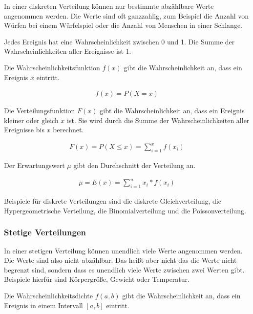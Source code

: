 \documentclass[12pt]{scrartcl}
\begin{document}
In einer diskreten Verteilung können nur bestimmte abzählbare Werte angenommen werden.
Die Werte sind oft ganzzahlig, zum Beispiel die Anzahl von Würfen bei einem Würfelspiel oder die Anzahl von Menschen in einer Schlange.\par

Jedes Ereignis hat eine Wahrscheinlichkeit zwischen 0 und 1.
Die Summe der Wahrscheinlichkeiten aller Ereignisse ist 1.\par

Die Wahrscheinlichkeitsfunktion $f(x)$ gibt die Wahrscheinlichkeit an, dass ein Ereignis $x$ eintritt.\par

\begin{align*}
    f(x) = P(X=x)
\end{align*}

Die Verteilungsfunktion $F(x)$ gibt die Wahrscheinlichkeit an, dass ein Ereignis kleiner oder gleich $x$ ist.
Sie wird durch die Summe der Wahrscheinlichkeiten aller Ereignisse bis $x$ berechnet.\par

\begin{align*}
    F(x) = P(X \leq x) = \sum_{i=1}^{x} f(x_i)
\end{align*}

Der Erwartungswert $\mu$ gibt den Durchschnitt der Verteilung an.\par

\begin{align*}
    \mu = E(x) = \sum_{i=1}^{n} x_i * f(x_i)
\end{align*}

Beispiele für diskrete Verteilungen sind die diskrete Gleichverteilung, die Hypergeometrische Verteilung, die Binomialverteilung und die Poissonverteilung.

\subsubsection{Stetige Verteilungen}

In einer stetigen Verteilung können unendlich viele Werte angenommen werden. Die Werte sind also nicht abzählbar.
Das heißt aber nicht das die Werte nicht begrenzt sind, sondern dass es unendlich viele Werte zwischen zwei Werten gibt.
Beispiele hierfür sind Körpergröße, Gewicht oder Temperatur.\par

Die Wahrscheinlichkeitsdichte $f(a,b)$ gibt die Wahrscheinlichkeit an, dass ein Ereignis in einem Intervall $[a,b]$ eintritt.\par
\end{document}
